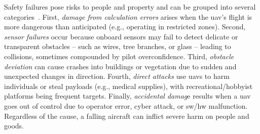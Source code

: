 
Safety failures pose risks to people and property and can be grouped into
several categories~\cite{ferrao2020stuart}. First, \emph{damage from calculation
errors} arises when the \gls{uav}'s flight is more dangerous than anticipated
(e.g., operating in restricted zones).
%
Second, \emph{sensor failures} occur because onboard sensors may fail to detect
delicate or transparent obstacles -- such as wires, tree branches, or glass --
leading to collisions, sometimes compounded by pilot overconfidence.
%
Third, \emph{obstacle deviation} can cause crashes into buildings or
vegetation due to sudden and unexpected changes in direction.
%
Fourth, \emph{direct attacks} use \glspl{uav} to harm individuals or steal
payloads (e.g., medical supplies), with recreational/hobbyist platforms being
frequent targets.
%
Finally, \emph{accidental damag}e results when a \gls{uav} goes out
of control due to operator error, cyber attack, or \gls{sw}/\gls{hw}
malfunction.
Regardless of the cause, a falling aircraft can inflict severe harm on people and goods.

